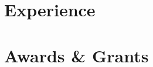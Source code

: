 \documentclass[]{deedy-resume-openfont}
\begin{document}
\hfill
\begin{minipage}[t]{0.66\textwidth} 


\section{Experience}





\section{Awards \& Grants}





\end{minipage} 
\end{document}
